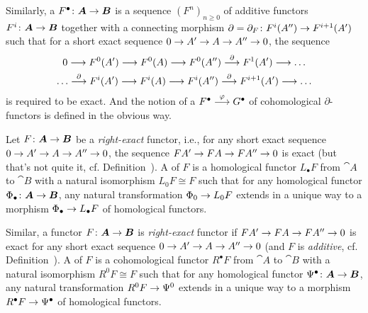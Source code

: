 \documentclass[a4paper,parskip=half,numbers=enddot, DIV=12]{scrreprt}
\renewcommand{\geq}{\geqslant}
\begin{document}
\begin{defi}
	Similarly, a  $F^\bullet \colon{\cat A}\morphism{\cat B}$ is a sequence $(F^n)_{n\geq 0}$ of additive functors $F^i\colon{\cat A}\morphism{\cat B}$ together with a connecting morphism $\partial=\partial_F\colon F^i(A'')\morphism F^{i+1}(A')$ such that for a short exact sequence $0\morphism A'\morphism A\morphism A''\morphism 0$, the sequence 
	\begin{multline*}
		0\morphism F^0(A')\morphism F^0(A)\morphism F^0(A'')\morphism[\partial] F^1(A')\morphism\ldots\\
		\ldots\morphism[\partial]F^i(A')\morphism F^i(A)\morphism F^i(A'')\morphism[\partial]F^{i+1}(A')\morphism\ldots
	\end{multline*}
	 is required to be exact. And the notion of a  $F^\bullet \morphism[\phi]G^\bullet $ of cohomological $\partial$-functors is defined in the obvious way.
	
	Let $F\colon{\cat A}\morphism{\cat B}$ be a \emph{right-exact} functor, i.e., for any short exact sequence $0\morphism A'\morphism A\morphism A''\morphism 0$, the sequence $FA'\morphism FA\morphism FA''\morphism 0$ is exact (but that's not quite it, cf. Definition~). A  of $F$ is a homological functor $L_\bullet F$ from ${\cat A}$ to ${\cat B}$ with a natural isomorphism $L_0F\cong F$ such that for any homological functor $\Phi_\bullet \colon {\cat A}\morphism{\cat B}$, any natural transformation $\Phi_0\morphism L_0F$ extends in a unique way to a morphism $\Phi_\bullet \morphism L_\bullet F$ of homological functors.
	
	Similar, a functor $F\colon{\cat A}\morphism{\cat B}$ is \emph{right-exact} functor if $FA'\morphism FA\morphism FA''\morphism 0$ is exact for any short exact sequence $0\morphism A'\morphism A\morphism A''\morphism 0$ (and $F$ is \emph{additive}, cf. Definition~). A  of $F$ is a cohomological functor $R^\bullet F$ from ${\cat A}$ to ${\cat B}$ with a natural isomorphism $R^0F\cong F$ such that for any homological functor $\Psi^\bullet \colon {\cat A}\morphism{\cat B}$, any natural transformation $R^0F\morphism \Psi^0$ extends in a unique way to a morphism $R^\bullet F\morphism \Psi^\bullet $ of homological functors.
\end{defi}
\end{document}
